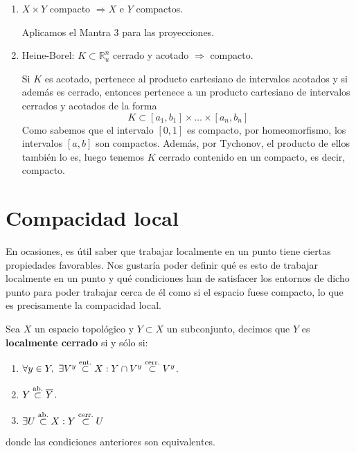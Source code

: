 \begin{obs}
\begin{enumerate}
    \item $X \times Y$ compacto $\Rightarrow X$ e $Y$ compactos.\begin{demo}
        Aplicamos el Mantra $3$ para las proyecciones.
    \end{demo} 
    \item Heine-Borel: $K \subset \mathbb{R}_u^n$ cerrado y acotado $\Rightarrow$ compacto.
    \begin{demo}
    Si $K$ es acotado, pertenece al producto cartesiano de intervalos acotados y si además es cerrado, entonces pertenece a un producto cartesiano de intervalos cerrados y acotados de la forma
    \[
	K \subset \left[ a_1, b_1 \right] \times \ldots \times \left[ a_n, b_n \right]
    \]
    Como sabemos que el intervalo $[0,1]$ es compacto, por homeomorfismo, los intervalos $[a,b]$ son compactos. Además, por Tychonov, el producto de ellos también lo es, luego tenemos $K$ cerrado contenido en un compacto, es decir, compacto.
    \end{demo}
\end{enumerate}
\end{obs}


\chapter{Compacidad local}%
\label{cha:compacidad_local}
En ocasiones, es útil saber que trabajar localmente en un punto tiene ciertas propiedades favorables. Nos gustaría poder definir qué es esto de trabajar localmente en un punto y qué condiciones han de satisfacer los entornos de dicho punto para poder trabajar cerca de él como si el espacio fuese compacto, lo que es precisamente la compacidad local.

\begin{defi}
Sea $X$ un espacio topológico y $Y \subset X$ un subconjunto, decimos que $Y$ es \textbf{localmente cerrado} si y sólo si:
\begin{enumerate}
    \item $\forall y \in Y,\ \exists V^y \stackrel{\text{ent.}}{\subset} X: Y \cap V^y \stackrel{\text{cerr.}}{\subset} V^y$.
    \item $Y \stackrel{\text{ab.}}{\subset} \overline{Y}$.
    \item $\exists U \stackrel{\text{ab.}}{\subset} X : Y \stackrel{\text{cerr.}}{\subset} U$
\end{enumerate}
donde las condiciones anteriores son equivalentes.
\end{defi}


